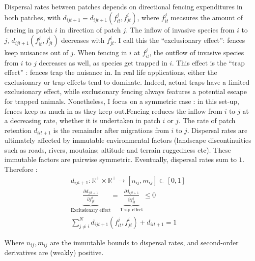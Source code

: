 Dispersal rates between patches depends on directional fencing expenditures in both patches, with $d_{ijt+1} \equiv d_{ijt+1}(f_{it}^j, f_{jt}^i)$, where $f_{it}^j$ measures the amount of fencing in patch $i$ in direction of patch $j$. The inflow of invasive species from $i$ to $j$, $d_{ijt+1}(f_{it}^j,f_{jt}^i)$ decreases with $f_{jt}^i$. I call this the ``exclusionary effect'': fences keep nuisances out of $j$. When fencing in $i$ at $f_{it}^j$, the outflow of invasive species from $i$ to $j$ decreases as well, as species get trapped in $i$. This effect is the ``trap effect'' : fences trap the nuisance in. In real life applications, either the exclusionary or trap effects tend to dominate. Indeed, actual traps have a limited exclusionary effect, while exclusionary fencing always features a potential escape for trapped animals. Nonetheless, I focus on a symmetric case : in this set-up, fences keep as much in as they keep out.Fencing reduces the inflow from $i$ to $j$ at a decreasing rate, whether it is undertaken in patch $i$ or $j$. The rate of patch retention $d_{iit+1}$ is the remainder after migrations from $i$ to $j$.
Dispersal rates are ultimately affected by immutable environmental factors (landscape discontinuities such as roads, rivers, moutains; altitude and terrain ruggedness etc). These immutable factors are pairwise symmetric. Eventually, dispersal rates sum to $1$. Therefore : 
\begin{align}
d_{ijt+1} : \mathbb{R}^+ \times \mathbb{R}^+ \to [n_{ij},m_{ij}] \subset [0,1] \\
\underbrace{\frac{\partial d_{jit+1}}{\partial f_{jt}^i}}_{\text{Exclusionary effect}}=\underbrace{\frac{\partial d_{ijt+1}}{\partial f_{it}^j}}_{\text{Trap effect}} \leq 0\\
\sum_{j\neq i}^N d_{ijt+1}(f_{it}^j, f_{jt}^i) + d_{iit+1} =1
\end{align}

Where $n_{ij}, m_{ij}$ are the immutable bounds to dispersal rates, and second-order derivatives are (weakly) positive. 


